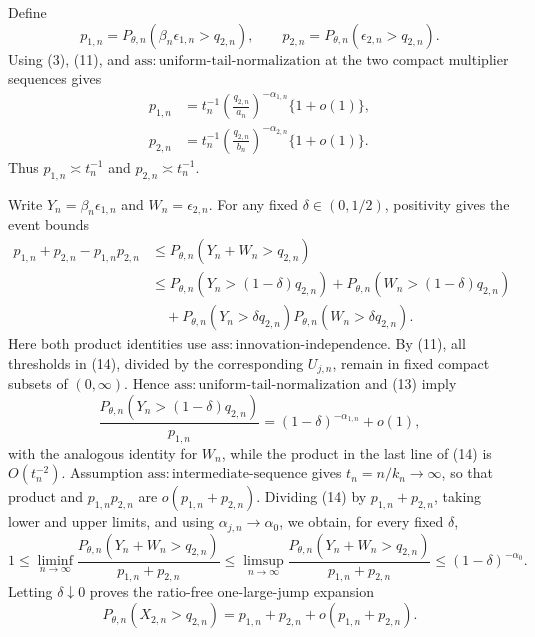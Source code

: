 Define
\[
p_{1,n}=P_{\theta,n}(\beta_n\epsilon_{1,n}>q_{2,n}),
\qquad
p_{2,n}=P_{\theta,n}(\epsilon_{2,n}>q_{2,n}).
\tag{12}
\]
Using (3), (11), and \(\mathrm{ass{:}uniform\text{-}tail\text{-}normalization}\) at the two compact multiplier sequences gives
\[
\begin{aligned}
p_{1,n}
&=t_n^{-1}\left(\frac{q_{2,n}}{a_n}\right)^{-\alpha_{1,n}}\{1+o(1)\},\\
p_{2,n}
&=t_n^{-1}\left(\frac{q_{2,n}}{b_n}\right)^{-\alpha_{2,n}}\{1+o(1)\}.
\end{aligned}
\tag{13}
\]
Thus \(p_{1,n}\asymp t_n^{-1}\) and \(p_{2,n}\asymp t_n^{-1}\).

Write \(Y_n=\beta_n\epsilon_{1,n}\) and \(W_n=\epsilon_{2,n}\). For any fixed \(\delta\in(0,1/2)\), positivity gives the event bounds
\[
\begin{aligned}
p_{1,n}+p_{2,n}-p_{1,n}p_{2,n}
&\leq P_{\theta,n}(Y_n+W_n>q_{2,n})\\
&\leq P_{\theta,n}(Y_n>(1-\delta)q_{2,n})
+P_{\theta,n}(W_n>(1-\delta)q_{2,n})\\
&\quad+P_{\theta,n}(Y_n>\delta q_{2,n})
P_{\theta,n}(W_n>\delta q_{2,n}).
\end{aligned}
\tag{14}
\]
Here both product identities use \(\mathrm{ass{:}innovation\text{-}independence}\). By (11), all thresholds in (14), divided by the corresponding \(U_{j,n}\), remain in fixed compact subsets of \((0,\infty)\). Hence \(\mathrm{ass{:}uniform\text{-}tail\text{-}normalization}\) and (13) imply
\[
\frac{P_{\theta,n}(Y_n>(1-\delta)q_{2,n})}{p_{1,n}}
=(1-\delta)^{-\alpha_{1,n}}+o(1),
\tag{15}
\]
with the analogous identity for \(W_n\), while the product in the last line of (14) is \(O(t_n^{-2})\). Assumption \(\mathrm{ass{:}intermediate\text{-}sequence}\) gives \(t_n=n/k_n\to\infty\), so that product and \(p_{1,n}p_{2,n}\) are \(o(p_{1,n}+p_{2,n})\). Dividing (14) by \(p_{1,n}+p_{2,n}\), taking lower and upper limits, and using \(\alpha_{j,n}\to\alpha_0\), we obtain, for every fixed \(\delta\),
\[
1\leq\liminf_{n\to\infty}
\frac{P_{\theta,n}(Y_n+W_n>q_{2,n})}{p_{1,n}+p_{2,n}}
\leq\limsup_{n\to\infty}
\frac{P_{\theta,n}(Y_n+W_n>q_{2,n})}{p_{1,n}+p_{2,n}}
\leq(1-\delta)^{-\alpha_0}.
\]
Letting \(\delta\downarrow0\) proves the ratio-free one-large-jump expansion
\[
P_{\theta,n}(X_{2,n}>q_{2,n})
=p_{1,n}+p_{2,n}+o(p_{1,n}+p_{2,n}).
\tag{16}
\]

